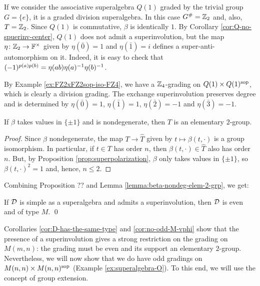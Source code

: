 \begin{ex}
	If we consider the associative superalgebra $Q(1)$ graded by the trivial group $G = \{e\}$, it is a graded division superalgebra.
	In this case $G^\# = \mathbb{Z}_2$ and, also, $T = \mathbb{Z}_2$.
	Since $Q(1)$ is commutative, $\beta$ is identically $1$.
	By Corollary \ref{cor:Q-no-spuerinv-center}, $Q(1)$ does not admit a superinvolution, but the map $\eta\colon \mathbb{Z}_2 \to \mathbb{F}^\times$ given by $\eta (\bar 0) = 1$ and $\eta( \bar 1) = i$ defines a super-anti-automorphism on it.
	Indeed, it is easy to check that $(-1)^{p(a) p(b)} =  \eta(ab) \eta(a)^{-1} \eta(b)^{-1}$.
\end{ex}

\begin{ex}\label{ex:FZ4-revisited}
	By Example \ref{ex:FZ2xFZ2sop-iso-FZ4}, we have a $\mathbb{Z}_4$-grading on $Q(1)\times Q(1)^{\mathrm{sop}}$, which is clearly a division grading.
	The exchange superinvolution preserves degree and is determined by $\eta (\bar 0) = 1$, $\eta (\bar 1) = 1$, $\eta (\bar 2) = -1$ and $\eta (\bar 3) = -1$.
\end{ex}

\begin{lemma}\label{lemma:beta-nondeg-elem-2-grp}
	If $\beta$ takes values in $\{ \pm 1 \}$ and is nondegenerate, then $T$ is an elementary $2$-group.
\end{lemma}

\begin{proof}
	Since $\beta$ nondegenerate, the map $T \to \widehat T$ given by $t \mapsto \beta(t, \cdot)$ is a group isomorphism.
	In particular, if $t\in T$ has order $n$, then $\beta(t, \cdot)\in \widehat T$ also has order $n$.
	But, by Proposition \ref{prop:superpolarization}, $\beta$ only takes values in $\{ \pm 1\}$, so  $\beta(t, \cdot )^2 =1$ and, hence, $ n \leq 2$.
\end{proof}

Combining Proposition ??  %
and Lemma \ref{lemma:beta-nondeg-elem-2-grp}, we get:

\begin{cor}\label{cor:no-odd-M-vphi}
	If $\mathcal{D}$ is simple as a superalgebra and admits a superinvolution, then $\mathcal{D}$ is even and of type $M$. \qed
\end{cor}


Corollaries \ref{cor:D-has-the-same-type} and \ref{cor:no-odd-M-vphi} show that the presence of a superinvolution gives a strong restriction on the grading on $M(m,n)$: the grading must be even and its support an elementary $2$-group.
Nevertheless, we will now show that we do have odd gradings on $M(n,n)\times M(n,n)^{\mathrm{sop}}$ (Example \ref{ex:superalgebra-O}).
To this end, we will use the concept of group extension.

